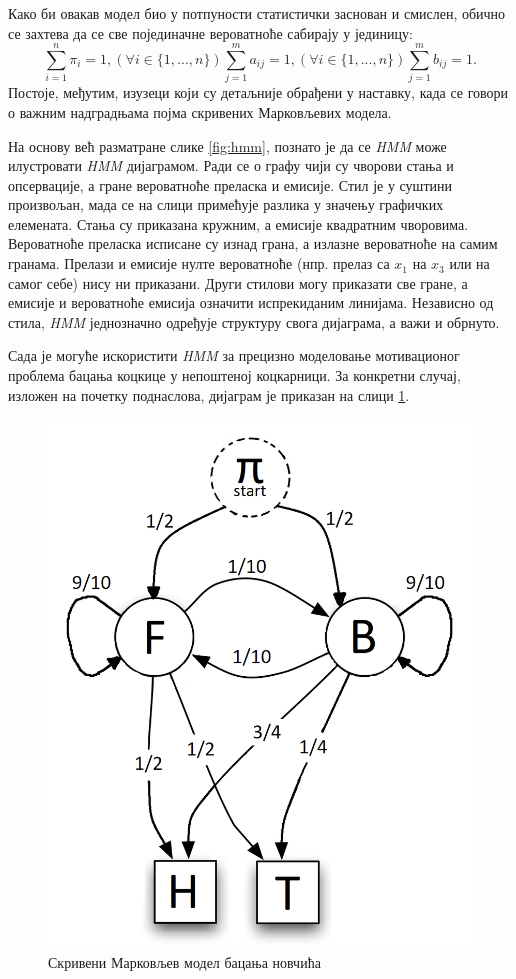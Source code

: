 \documentclass[12pt,oneside]{memoir}
\begin{document}
\begin{CJK}{UTF8}{ipxm}
Како би овакав модел био у потпуности статистички заснован и смислен, обично се захтева да се све појединачне вероватноће сабирају у јединицу: $$\sum_{i=1}^n \pi_i = 1, (\forall i \in \{1, ..., n\}) \sum_{j=1}^m a_{ij} = 1, (\forall i \in \{1, ..., n\}) \sum_{j=1}^m b_{ij} = 1.$$ Постоје, међутим, изузеци који су детаљније обрађени у наставку, када се говори о важним надградњама појма скривених Марковљевих модела.

На основу већ разматране слике \ref{fig:hmm}, познато је да се \textit{HMM} може илустровати \textit{HMM} дијаграмом. Ради се о графу чији су чворови стања и опсервације, а гране вероватноће преласка и емисије. Стил је у суштини произвољан, мада се на слици примећује разлика у значењу графичких елемената. Стања су приказана кружним, а емисије квадратним чворовима. Вероватноће преласка исписане су изнад грана, а излазне вероватноће на самим гранама. Прелази и емисије нулте вероватноће (нпр. прелаз са $x_1$ на $x_3$ или на самог себе) нису ни приказани. Други стилови могу приказати све гране, а емисије и вероватноће емисија означити испрекиданим линијама. Независно од стила, \textit{HMM} једнозначно одређује структуру свога дијаграма, а важи и обрнуто.

Сада је могуће искористити \textit{HMM} за прецизно моделовање мотивационог проблема бацања коцкице у непоштеној коцкарници. За конкретни случај, изложен на почетку поднаслова, дијаграм је приказан на слици \ref{fig:kock}.

\begin{figure}[H]
  \centering
  \includegraphics[width=.5\textwidth]{kockarnica.png}
  \caption{Скривени Марковљев модел бацања новчића}
  \label{fig:kock}
\end{figure}


\end{CJK}
\end{document}
